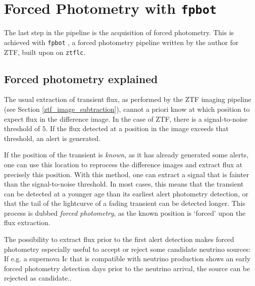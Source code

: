 \documentclass[
    a4paper, %
    fontsize=10pt, %
    twoside=true, %
    numbers=noenddot, %
    fontmethod=tex,
]{kaobook}
\begin{document}
\section{Forced Photometry with \texttt{fpbot}} \label{fpbot}
The last step in the pipeline is the acquisition of forced photometry. This is achieved with \texttt{fpbot} , a forced photometry pipeline written by the author for ZTF, built upon on \texttt{ztflc}.

\subsection{Forced photometry explained}
The usual extraction of transient flux, as performed by the ZTF imaging pipeline (see Section \ref{ztf_image_subtraction}), cannot a priori know at which position to expect flux in the difference image. In the case of ZTF, there is a signal-to-noise threshold of $5$. If the flux detected at a position in the image exceeds that threshold, an alert is generated.

If the position of the transient is \textit{known}, as it has already generated some alerts, one can use this location to reprocess the difference images and extract flux at precisely this position. With this method, one can extract a signal that is fainter than the signal-to-noise threshold. In most cases, this means that the transient can be detected at a younger age than its earliest alert photometry detection, or that the tail of the lightcurve of a fading transient can be detected longer. This process is dubbed \textit{forced photometry}, as the known position is `forced' upon the flux extraction.

The possibility to extract flux prior to the first alert detection makes forced photometry especially useful to accept or reject some candidate neutrino sources: If e.g. a supernova Ic that is compatible with neutrino production shows an early forced photometry detection days prior to the neutrino arrival, the source can be rejected as candidate..
\end{document}
